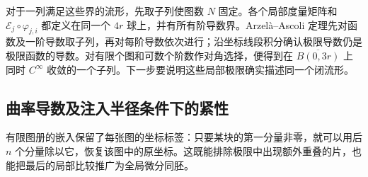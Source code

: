 对于一列满足这些界的流形，先取子列使图数 \(N\) 固定。各个局部度量矩阵和 \(\mathcal E_j\circ\varphi_{j,i}\) 都定义在同一个 \(4r\) 球上，并有所有阶导数界。Arzelà--Ascoli 定理先对函数及一阶导数取子列，再对每阶导数依次进行；沿坐标线段积分确认极限导数仍是极限函数的导数。对有限个图和可数个阶数作对角选择，便得到在 \(\overline{B(0,3r)}\) 上同时 \(C^\infty\) 收敛的一个子列。下一步要说明这些局部极限确实描述同一个闭流形。

\subsection{曲率导数及注入半径条件下的紧性}
\label{g3:subsec:2901:03}
有限图册的嵌入保留了每张图的坐标标签：只要某块的第一分量非零，就可以用后 \(n\) 个分量除以它，恢复该图中的原坐标。这既能排除极限中出现额外重叠的片，也能把最后的局部比较推广为全局微分同胚。

